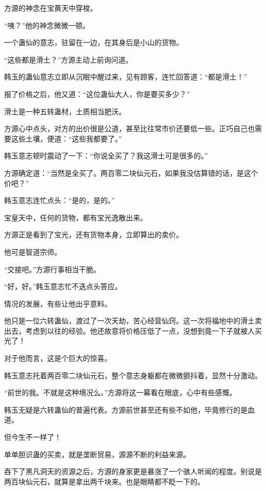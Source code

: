 
\begin{this_body}



方源的神念在宝黄天中穿梭。

“咦？”他的神念微微一顿。

一个蛊仙的意志，驻留在一边，在其身后是小山的货物。

“这些都是滑土？”方源主动上前询问道。

韩玉的蛊仙意志立即从沉眠中醒过来，见有顾客，连忙回答道：“都是滑土！”

报了价格之后，他又道：“这位蛊仙大人，你是要买多少？”

滑土是一种五转蛊材，土质相当肥沃。

方源心中点头，对方的出价很是公道，甚至比往常市价还要低一些。正巧自己也需要这些土壤，便道：“这些我都要了。”

韩玉意志顿时震动了一下：“你说全买了？我这滑土可是很多的。”

方源确定道：“当然是全买了。两百零二块仙元石，如果我没估算错的话，是这个价吧？”

韩玉意志连忙点头：“是的，是的。”

宝皇天中，任何的货物，都有宝光逸散出来。

方源正是看到了宝光，还有货物本身，立即算出的卖价。

他可是智道宗师。

“交接吧。”方源行事相当干脆。

“好，好。”韩玉意志忙不迭点头答应。

情况的发展，有些让他出乎意料。

他只是一位六转蛊仙，渡过了一次天劫，苦心经营仙窍。这一次将福地中的滑土卖出去，考虑到以往的经验。他还故意将价格压低了一点，没想到竟一下子就被人买光了！

对于他而言，这是个巨大的惊喜。

韩玉意志托着两百零二块仙元石，整个意志身躯都在微微颤抖着，显然十分激动。

“前世的我。不就是这种境况么。”方源将这一幕看在眼底，心中有些感慨。

韩玉无疑是六转蛊仙的普遍代表。方源前世甚至还有些不如他，毕竟修行的是血道。

但今生不一样了！

单单胆识蛊的买卖，就是垄断贸易，源源不断的利益来源。

吞下了黑凡洞天的资源之后，方源的身家更是暴涨了一个骇人听闻的程度。别说是两百块仙元石，就算是拿出两千块来。也是眼睛都不眨一下的。


\end{this_body}
